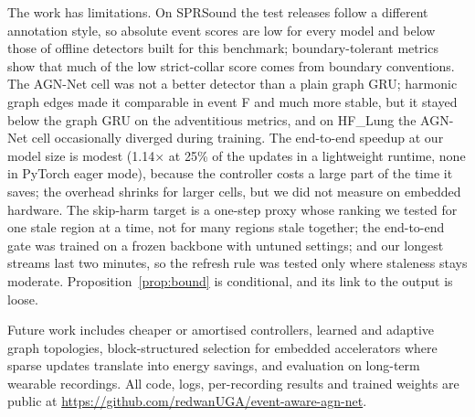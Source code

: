 The work has limitations. On SPRSound the test releases follow a different annotation style, so absolute event scores are low for every model and below those of offline detectors built for this benchmark; boundary-tolerant metrics show that much of the low strict-collar score comes from boundary conventions. The AGN-Net cell was not a better detector than a plain graph GRU; harmonic graph edges made it comparable in event F and much more stable, but it stayed below the graph GRU on the adventitious metrics, and on HF\_Lung the AGN-Net cell occasionally diverged during training. The end-to-end speedup at our model size is modest (1.14$\times$ at 25\% of the updates in a lightweight runtime, none in PyTorch eager mode), because the controller costs a large part of the time it saves; the overhead shrinks for larger cells, but we did not measure on embedded hardware. The skip-harm target is a one-step proxy whose ranking we tested for one stale region at a time, not for many regions stale together; the end-to-end gate was trained on a frozen backbone with untuned settings; and our longest streams last two minutes, so the refresh rule was tested only where staleness stays moderate. Proposition~\ref{prop:bound} is conditional, and its link to the output is loose.

Future work includes cheaper or amortised controllers, learned and adaptive graph topologies, block-structured selection for embedded accelerators where sparse updates translate into energy savings, and evaluation on long-term wearable recordings. All code, logs, per-recording results and trained weights are public at \url{https://github.com/redwanUGA/event-aware-agn-net}.

